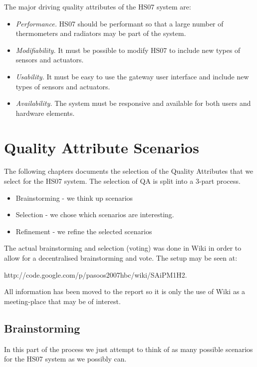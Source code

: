 \documentclass[a4paper,10pt]{article}
\begin{document}
The major driving quality attributes of the HS07 system
are:

\begin{itemize}
\item \emph{Performance.} HS07 should be performant so that a large
  number of thermometers and radiators may be part of the system.
\item \emph{Modifiability.} It must be possible to modify HS07 to
  include new types of sensors and actuators.
\item \emph{Usability.} It must be easy to use the gateway user interface
  and include new types of sensors and actuators.
\item \emph{Availability.} The system must be responsive and available for 
both users and hardware elements.
\end{itemize}




\section{Quality Attribute Scenarios}
The following chapters documents the selection of the Quality Attributes that we 
select for the HS07 system. The selection of QA is split into a 3-part process.
\begin{itemize}
\item Brainstorming - we think up scenarios
\item Selection - we chose which scenarios are interesting.
\item Refinement - we refine the selected scenarios
\end{itemize}
The actual brainstorming and selection (voting) was done in Wiki in order to allow for a decentralised brainstorming and vote. The setup may be seen at:
 
http://code.google.com/p/pasoos2007hbc/wiki/SAiPM1H2.

All information has been moved to the report so it is only the use of Wiki as a meeting-place that may be of interest.

\subsection{Brainstorming}
In this part of the process we just attempt to think of as many possible scenarios for the HS07 system as we possibly can. 
\end{document}
